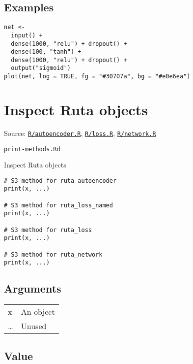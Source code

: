 \hypertarget{examples}{\subsection{\texorpdfstring{\protect\hyperlink{examples}{}Examples}{Examples}}\label{examples}}

\begin{verbatim}
net <-
  input() +
  dense(1000, "relu") + dropout() +
  dense(100, "tanh") +
  dense(1000, "relu") + dropout() +
  output("sigmoid")
plot(net, log = TRUE, fg = "#30707a", bg = "#e0e6ea")
\end{verbatim}

\section{Inspect Ruta objects}\label{inspect-ruta-objects}

Source:
\href{https://github.com/fdavidcl/ruta/blob/master/R/autoencoder.R}{\texttt{R/autoencoder.R}},
\href{https://github.com/fdavidcl/ruta/blob/master/R/loss.R}{\texttt{R/loss.R}},
\href{https://github.com/fdavidcl/ruta/blob/master/R/network.R}{\texttt{R/network.R}}

\texttt{print-methods.Rd}

Inspect Ruta objects

\begin{verbatim}
# S3 method for ruta_autoencoder
print(x, ...)

# S3 method for ruta_loss_named
print(x, ...)

# S3 method for ruta_loss
print(x, ...)

# S3 method for ruta_network
print(x, ...)
\end{verbatim}

\hypertarget{arguments}{\subsection{\texorpdfstring{\protect\hyperlink{arguments}{}Arguments}{Arguments}}\label{arguments}}

\begin{longtable}[c]{@{}>{\small}p{3cm}>{\raggedright}p{12.5cm}@{}}
\toprule
x & An object\tabularnewline
\ldots{} & Unused\tabularnewline
\bottomrule
\end{longtable}

\hypertarget{value}{\subsection{\texorpdfstring{\protect\hyperlink{value}{}Value}{Value}}\label{value}}

